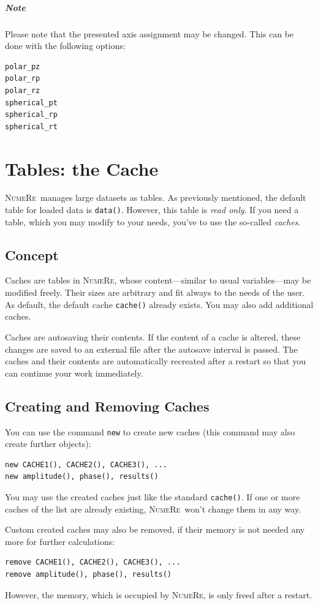 \documentclass[DIV=14,headsepline,footsepline]{scrbook}
\newcommand{\NR}{\textsc{Nu\-me\-Re}}
\begin{document}
				\paragraph{Note}
					Please note that the presented axis assignment may be changed. This can be done with the following options:
\begin{lstlisting}
polar_pz
polar_rp
polar_rz
spherical_pt
spherical_rp
spherical_rt
\end{lstlisting}
				
		\chapter{Tables: the Cache}
			\NR\ manages large datasets as tables. As previously mentioned, the default table for loaded data is \lstinline+data()+. However, this table is \emph{read only}. If you need a table, which you may modify to your needs, you've to use the so-called \emph{caches}.
			\section{Concept}
				Caches are tables in \NR, whose content---similar to usual variables---may be modified freely. Their sizes are arbitrary and fit always to the needs of the user. As default, the default cache \lstinline+cache()+ already exists. You may also add additional caches.
				
				Caches are autosaving their contents. If the content of a cache is altered, these changes are saved to an external file after the autosave interval is passed. The caches and their contents are automatically recreated after a restart so that you can continue your work immediately.
			\section{Creating and Removing Caches}
				You can use the command \lstinline+new+ to create new caches (this command may also create further objects):
				\begin{lstlisting}
new CACHE1(), CACHE2(), CACHE3(), ...
new amplitude(), phase(), results()
				\end{lstlisting}
				You may use the created caches just like the standard \lstinline+cache()+. If one or more caches of the list are already existing, \NR\ won't change them in any way.
				
				Custom created caches may also be removed, if their memory is not needed any more for further calculations:
				\begin{lstlisting}
remove CACHE1(), CACHE2(), CACHE3(), ...
remove amplitude(), phase(), results()
				\end{lstlisting}
				However, the memory, which is occupied by \NR, is only freed after a restart.
				
\end{document}
